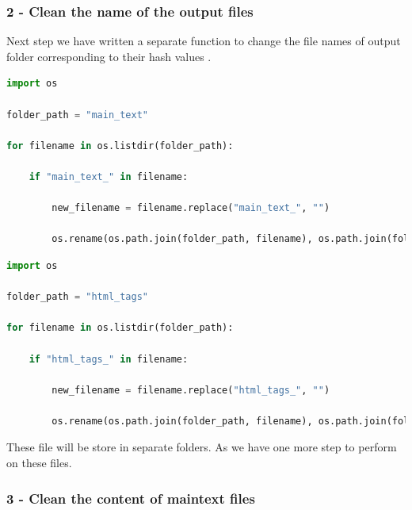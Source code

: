 \documentclass[12pt]{article}
\begin{document}
\subsubsection*{2 - Clean the name of the output files }

Next step we have written a separate function to change the file names of output folder corresponding to their hash values .
\\
\begin{lstlisting}[language=Python, caption=function to get response from each URI]
import os

folder_path = "main_text"

for filename in os.listdir(folder_path):
    
    if "main_text_" in filename:
        
        new_filename = filename.replace("main_text_", "")
        
        os.rename(os.path.join(folder_path, filename), os.path.join(folder_path, new_filename))
\end{lstlisting} 

\begin{lstlisting}[language=Python, caption=function to get response from each URI]
import os

folder_path = "html_tags"

for filename in os.listdir(folder_path):
    
    if "html_tags_" in filename:
        
        new_filename = filename.replace("html_tags_", "")
        
        os.rename(os.path.join(folder_path, filename), os.path.join(folder_path, new_filename))
\end{lstlisting} 

These file will be store in separate folders. As we have one more step to perform on these files.

\subsubsection*{3 - Clean the content of maintext files}
\end{document}
